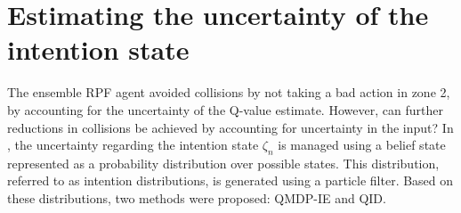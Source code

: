\section{Estimating the uncertainty of the intention state}
The ensemble RPF agent avoided collisions by not taking a bad action in zone 2, by accounting for the uncertainty of the Q-value estimate. However, can further reductions in collisions be achieved by accounting for uncertainty in the input? 
In \paperBelief, the uncertainty regarding the intention state $\zeta_n$ is managed using a belief state represented as a probability distribution over possible states. This distribution, referred to as intention distributions, is generated using a particle filter. Based on these distributions, two methods were proposed: QMDP-IE and QID.

% 			

